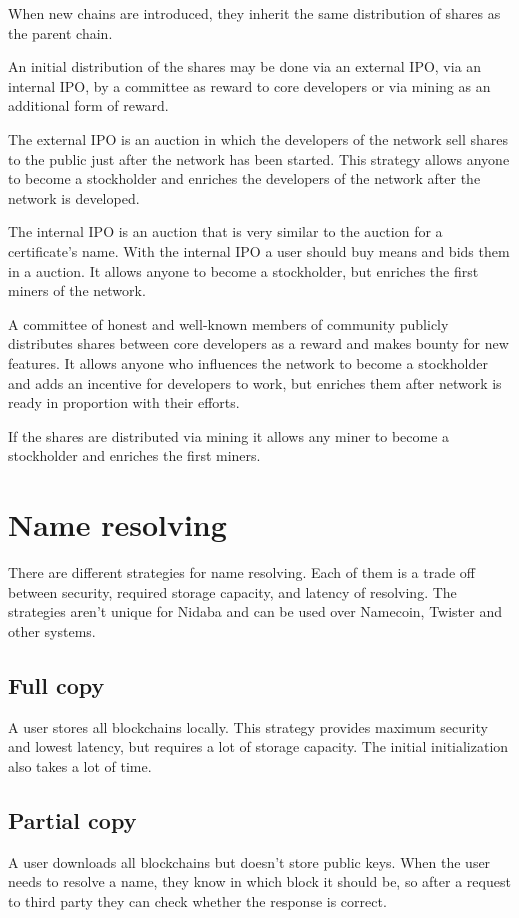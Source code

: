 \documentclass[12pt]{article}
\begin{document}
When new chains are introduced, they inherit the same distribution of shares as the parent chain.

An initial distribution of the shares may be done via an external IPO, via an internal IPO, by a committee as reward to core developers or via mining as an additional form of reward.

The external IPO is an auction in which the developers of the network sell shares to the public just after the network has been started. This strategy allows anyone to become a stockholder and enriches the developers of the network after the network is developed.

The internal IPO is an auction that is very similar to the auction for a certificate's name. With the internal IPO a user should buy means and bids them in a auction. It allows anyone to become a stockholder, but enriches the first miners of the network.

A committee of honest and well-known members of community publicly distributes shares between core developers as a reward and makes bounty for new features. It allows anyone who influences the network to become a stockholder and adds an incentive for developers to work, but enriches them after network is ready in proportion with their efforts.

If the shares are distributed via mining it allows any miner to become a stockholder and enriches the first miners.

\section{Name resolving}

There are different strategies for name resolving. Each of them is a trade off between security, required storage capacity, and latency of resolving. The strategies aren't unique for Nidaba and can be used over Namecoin, Twister and other systems.

\subsection{Full copy}
A user stores all blockchains locally. This strategy provides maximum security and lowest latency, but requires a lot of storage capacity. The initial initialization also takes a lot of time.

\subsection{Partial copy}
A user downloads all blockchains but doesn't store public keys. When the user needs to resolve a name, they know in which block it should be, so after a request to third party they can check whether the response is correct.
\end{document}
